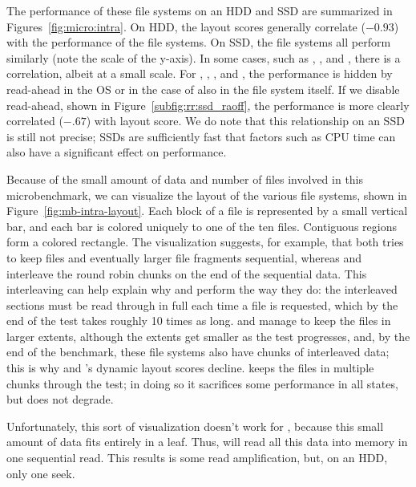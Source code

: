 

The performance of these file systems on an HDD and SSD are summarized in
Figures~\ref{fig:micro:intra}. On HDD, the layout scores generally correlate
($-0.93$) with the performance of the file systems.  On SSD, the file systems
all perform similarly (note the scale of the y-axis).  In some cases, such as
\xfs, \ext, and \zfs, there is a correlation, albeit at a small scale.  For
\btrfs, \ext, \xfs, and \ftwofs, the performance is hidden by read-ahead in the
OS or in the case of \btrfs also in the file system itself. If we disable
read-ahead, shown in Figure~\ref{subfig:rr:ssd_raoff}, the performance is more
clearly correlated ($-.67$) with layout score.  We do note that this
relationship on an SSD is still not precise; SSDs are sufficiently fast that
factors such as CPU time can also have a significant effect on performance.



Because of the small amount of data and number of files involved in this
microbenchmark, we can visualize the layout of the various file systems, shown
in Figure~\ref{fig:mb-intra-layout}. Each block of a file is represented by a
small vertical bar, and each bar is colored uniquely to one of the ten files.
Contiguous regions form a colored rectangle.  The visualization suggests, for
example, that \ext both tries to keep files and eventually larger file
fragments sequential, whereas \btrfs and \ftwofs interleave the round robin
chunks on the end of the sequential data. This interleaving can help explain
why \btrfs and \ftwofs perform the way they do: the interleaved sections must
be read through in full each time a file is requested, which by the end of the
test takes roughly 10 times as long. \ext and \xfs manage to keep the files in
larger extents, although the extents get smaller as the test progresses, and,
by the end of the benchmark, these file systems also have chunks of interleaved
data; this is why \ext and \xfs's  dynamic layout scores decline.  \zfs keeps
the files in multiple chunks through the test; in doing so it sacrifices some
performance in all states, but does not degrade.

Unfortunately, this sort of visualization doesn't work for \betrfs, because
this small amount of data fits entirely in a leaf.  Thus, \betrfs will read all
this data into memory in one sequential read. This results is some read
amplification, but, on an HDD, only one seek.

